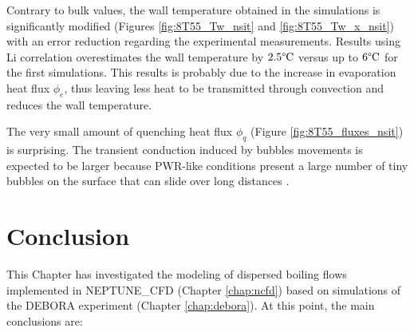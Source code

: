 \npar

Contrary to bulk values, the wall temperature obtained in the simulations is significantly modified (Figures \ref{fig:8T55_Tw_nsit} and \ref{fig:8T55_Tw_x_nsit}) with an error reduction regarding the experimental measurements. Results using Li \etal correlation overestimates the wall temperature by $2.5\degree\mathrm{C}$ versus up to $6\degree\mathrm{C}$ for the first simulations. This results is probably due to the increase in evaporation heat flux $\phi_{e}$, thus leaving less heat to be transmitted through convection and reduces the wall temperature.

\begin{remark*}{}
The very small amount of quenching heat flux $\phi_{q}$ (Figure \ref{fig:8T55_fluxes_nsit}) is surprising. The transient conduction induced by bubbles movements is expected to be larger because PWR-like conditions present a large number of tiny bubbles on the surface that can slide over long distances \cite{march_caracterisation_1999, kossolapov_experimental_2021}.
\end{remark*}


\section{Conclusion}


This Chapter has investigated the modeling of dispersed boiling flows implemented in NEPTUNE\_CFD (Chapter \ref{chap:ncfd}) based on simulations of the DEBORA experiment (Chapter \ref{chap:debora}). At this point, the main conclusions are:


